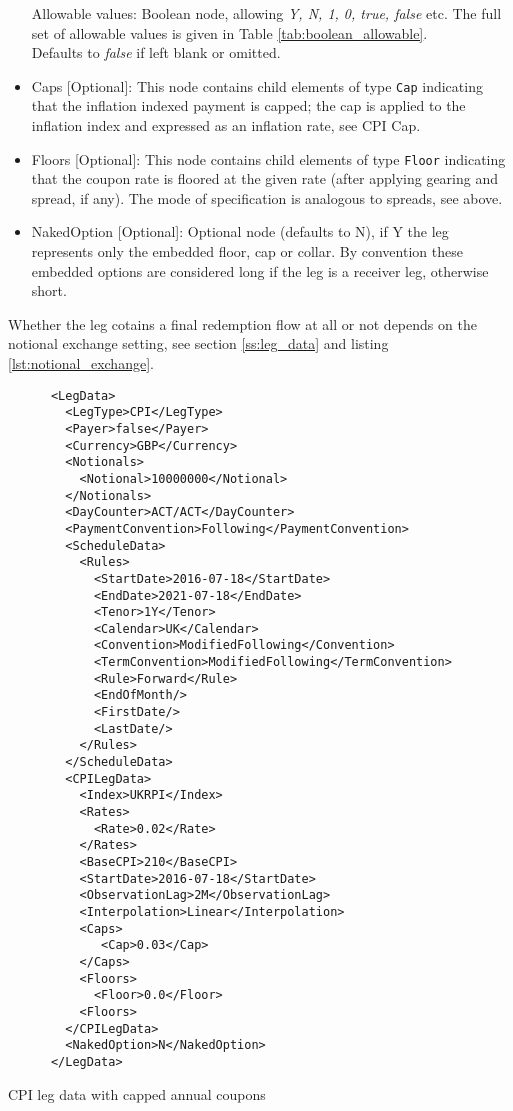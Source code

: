 \begin{itemize}
Allowable values: Boolean node, allowing \emph{Y, N, 1, 0, true, false} etc. The full set of allowable values is given in Table \ref{tab:boolean_allowable}.
\\Defaults to \emph{false}  if left blank or omitted.

\item Caps [Optional]: This node contains child elements of type
  \lstinline!Cap! indicating that the inflation indexed payment is
  capped; the cap is applied to the inflation index and expressed as
  an inflation rate, see CPI Cap.

\item Floors [Optional]: This node contains child elements of type \lstinline!Floor! indicating that the coupon rate is floored at
  the given rate (after applying gearing and spread, if any). The mode of specification is analogous to spreads, see
  above.

\item NakedOption [Optional]: Optional node (defaults to N), if Y the leg represents only the embedded floor, cap or collar. 
By convention these embedded options are considered long if the leg is a receiver leg, otherwise short. 
 
\end{itemize} 

Whether the leg cotains a final redemption flow at all or not depends on the
 notional exchange setting, see section \ref{ss:leg_data} and listing \ref{lst:notional_exchange}.

\begin{listing}[H]
\begin{verbatim}
      <LegData>
        <LegType>CPI</LegType>
        <Payer>false</Payer>
        <Currency>GBP</Currency>
        <Notionals>
          <Notional>10000000</Notional>
        </Notionals>
        <DayCounter>ACT/ACT</DayCounter>
        <PaymentConvention>Following</PaymentConvention>
        <ScheduleData>
          <Rules>
            <StartDate>2016-07-18</StartDate>
            <EndDate>2021-07-18</EndDate>
            <Tenor>1Y</Tenor>
            <Calendar>UK</Calendar>
            <Convention>ModifiedFollowing</Convention>
            <TermConvention>ModifiedFollowing</TermConvention>
            <Rule>Forward</Rule>
            <EndOfMonth/>
            <FirstDate/>
            <LastDate/>
          </Rules>
        </ScheduleData>
        <CPILegData>
          <Index>UKRPI</Index>
          <Rates>
            <Rate>0.02</Rate>
          </Rates>
          <BaseCPI>210</BaseCPI>
          <StartDate>2016-07-18</StartDate>
          <ObservationLag>2M</ObservationLag>
          <Interpolation>Linear</Interpolation>
          <Caps>
             <Cap>0.03</Cap>
          </Caps>
          <Floors>
            <Floor>0.0</Floor>
          <Floors>
        </CPILegData>
        <NakedOption>N</NakedOption>
      </LegData>
\end{verbatim}
\caption{CPI leg data with capped annual coupons}
\label{lst:cpilegdata}
\end{listing}

